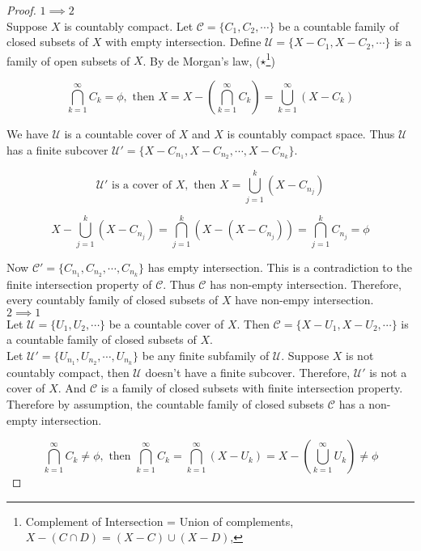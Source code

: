 \begin{proof}
	$1 \implies 2$\\
	Suppose $X$ is countably compact.
	Let $\mathcal{C} = \{C_1,C_2,\cdots\}$ be a countable family of closed subsets of $X$ with empty intersection.
	Define $\mathcal{U} = \{X-C_1, X-C_2, \cdots \}$ is a family of open subsets of $X$.
	By de Morgan's law, ($\star$\footnote{Complement of Intersection = Union of complements, $X - (C \cap D) = (X-C) \cup (X-D)$, })

	$$\bigcap_{k = 1}^\infty C_k = \phi, \text{ then } X =  X - \left(\bigcap_{k = 1}^\infty C_k\right) = \bigcup_{k = 1}^\infty (X-C_k)$$

	We have $\mathcal{U}$ is a countable cover of $X$ and $X$ is countably compact space.
	Thus $\mathcal{U}$ has a finite subcover $\mathcal{U}' = \{X-C_{n_1},X-C_{n_2},\cdots,X-C_{n_k}\}$.

	$$ \mathcal{U}' \text{ is a cover of } X, \text{ then } X = \bigcup_{j = 1}^k \left( X-C_{n_j} \right)$$

	$$X - \bigcup_{j = 1}^k \left( X-C_{n_j} \right) = \bigcap_{j = 1}^k \left( X - \left( X - C_{n_j} \right) \right) = \bigcap_{j = 1}^k C_{n_j} = \phi $$

	Now $\mathcal{C}' = \{ C_{n_1},C_{n_2},\cdots,C_{n_k}\}$ has empty intersection.
	This is a contradiction to the finite intersection property of $\mathcal{C}$.
	Thus $\mathcal{C}$ has non-empty intersection.
	Therefore, every countably family of closed subsets of $X$ have non-empy intersection.\\

	$2 \implies 1$\\

	Let $\mathcal{U}=\{ U_1, U_2, \cdots \}$ be a countable cover of $X$.
	Then $\mathcal{C} = \{ X-U_1,X-U_2,\cdots \}$ is a countable family of closed subsets of $X$.\\

	Let $\mathcal{U}'= \{ U_{n_1},U_{n_2},\cdots,U_{n_k}\}$ be any finite subfamily of $\mathcal{U}$.
	Suppose $X$ is not countably compact, then $\mathcal{U}$ doesn't have a finite subcover.
	Therefore, $\mathcal{U}'$ is not a cover of $X$.
	And $\mathcal{C}$ is a family of closed subsets with finite intersection property.\\

	Therefore by assumption, the countable family of closed subsets $\mathcal{C}$ has a non-empty intersection.

	$$ \bigcap_{k=1}^\infty C_k \ne \phi, \text{ then } \bigcap_{k=1}^\infty C_k = \bigcap_{k=1}^\infty \left( X - U_k \right) = X - \left( \bigcup_{k=1}^\infty U_k \right) \ne \phi $$


\end{proof}
